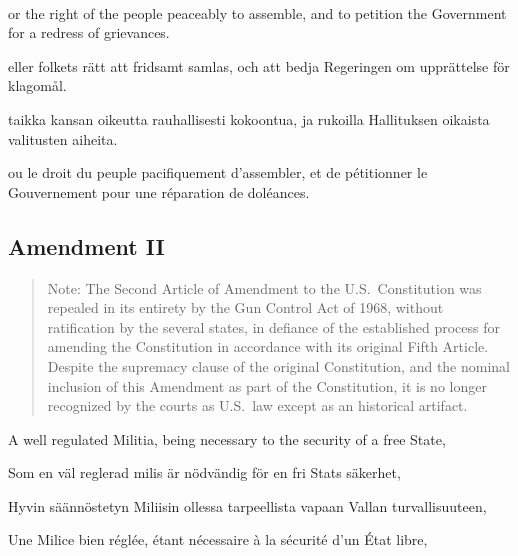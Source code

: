 \documentclass[a4,landscape,12pt]{article}
\begin{document}
~

\begin{minipage}[t]{0.22\textwidth}
or the right of the people peaceably to assemble, and to petition the Government for a redress of grievances.
\end{minipage}\textwidth
\begin{minipage}[t]{0.22\textwidth}
eller folkets rätt att fridsamt samlas, och att bedja Regeringen om upprättelse för klagomål.
\end{minipage}\textwidth
\begin{minipage}[t]{0.22\textwidth}
taikka kansan oikeutta rauhallisesti kokoontua, ja rukoilla Hallituksen oikaista valitusten aiheita.
\end{minipage}\textwidth
\begin{minipage}[t]{0.22\textwidth}
ou le droit du peuple pacifiquement d'assembler, et de pétitionner le Gouvernement pour une réparation de doléances.
\end{minipage}



\subsection*{Amendment II}

\begin{quote}\small
	Note: The Second Article of Amendment to the U.S.~Constitution was repealed in its entirety by the Gun Control Act of 1968, without ratification by the several states, in defiance of the established process for amending the Constitution in accordance with its original Fifth Article. Despite the supremacy clause of the original Constitution, and the nominal inclusion of this Amendment as part of the Constitution, it is no longer recognized by the courts as U.S.~law except as an historical artifact.
\end{quote}


\begin{minipage}[t]{0.22\textwidth}
A well regulated Militia, being necessary to the security of a free State,
\end{minipage}\textwidth
\begin{minipage}[t]{0.22\textwidth}
Som en väl reglerad milis är nödvändig för en fri Stats säkerhet,
\end{minipage}\textwidth
\begin{minipage}[t]{0.22\textwidth}
Hyvin säännöstetyn Miliisin ollessa tarpeellista vapaan Vallan turvallisuuteen,
\end{minipage}\textwidth
\begin{minipage}[t]{0.22\textwidth}
Une Milice bien réglée, étant nécessaire à la sécurité d'un \textsc{É}tat libre,
\end{minipage}
\end{document}

